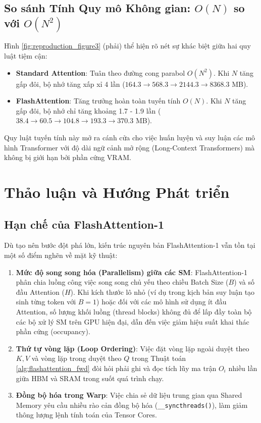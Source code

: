\documentclass[10pt,a4paper]{article}
\begin{document}
\subsection{So sánh Tính Quy mô Không gian: \texorpdfstring{$O(N)$ so với $O(N^2)$}{O(N) so voi O(N\textasciicircum 2)}}
Hình \ref{fig:reproduction_figure3} (phải) thể hiện rõ nét sự khác biệt giữa hai quy luật tiệm cận:
\begin{itemize}
    \item \textbf{Standard Attention}: Tuân theo đường cong parabol $O(N^2)$. Khi $N$ tăng gấp đôi, bộ nhớ tăng xấp xỉ 4 lần ($164.3 \to 568.3 \to 2144.3 \to 8368.3$ MB).
    \item \textbf{FlashAttention}: Tăng trưởng hoàn toàn tuyến tính $O(N)$. Khi $N$ tăng gấp đôi, bộ nhớ chỉ tăng khoảng 1.7 - 1.9 lần ($38.4 \to 60.5 \to 104.8 \to 193.3 \to 370.3$ MB).
\end{itemize}
Quy luật tuyến tính này mở ra cánh cửa cho việc huấn luyện và suy luận các mô hình Transformer với độ dài ngữ cảnh mở rộng (Long-Context Transformers) mà không bị giới hạn bởi phần cứng VRAM.

\section{Thảo luận và Hướng Phát triển}
\label{sec:discussion}

\subsection{Hạn chế của FlashAttention-1}
Dù tạo nên bước đột phá lớn, kiến trúc nguyên bản FlashAttention-1 vẫn tồn tại một số điểm nghẽn về mặt kỹ thuật:
\begin{enumerate}
    \item \textbf{Mức độ song song hóa (Parallelism) giữa các SM}: FlashAttention-1 phân chia luồng công việc song song chủ yếu theo chiều Batch Size ($B$) và số đầu Attention ($H$). Khi kích thước lô nhỏ (ví dụ trong kịch bản suy luận tạo sinh từng token với $B=1$) hoặc đối với các mô hình sử dụng ít đầu Attention, số lượng khối luồng (thread blocks) không đủ để lấp đầy toàn bộ các bộ xử lý SM trên GPU hiện đại, dẫn đến việc giảm hiệu suất khai thác phần cứng (occupancy).
    \item \textbf{Thứ tự vòng lặp (Loop Ordering)}: Việc đặt vòng lặp ngoài duyệt theo $K, V$ và vòng lặp trong duyệt theo $Q$ trong Thuật toán \ref{alg:flashattention_fwd} đòi hỏi phải ghi và đọc tích lũy ma trận $O_i$ nhiều lần giữa HBM và SRAM trong suốt quá trình chạy.
    \item \textbf{Đồng bộ hóa trong Warp}: Việc chia sẻ dữ liệu trung gian qua Shared Memory yêu cầu nhiều rào cản đồng bộ hóa (\texttt{\_\_syncthreads()}), làm giảm thông lượng lệnh tính toán của Tensor Cores.
\end{enumerate}
\end{document}
